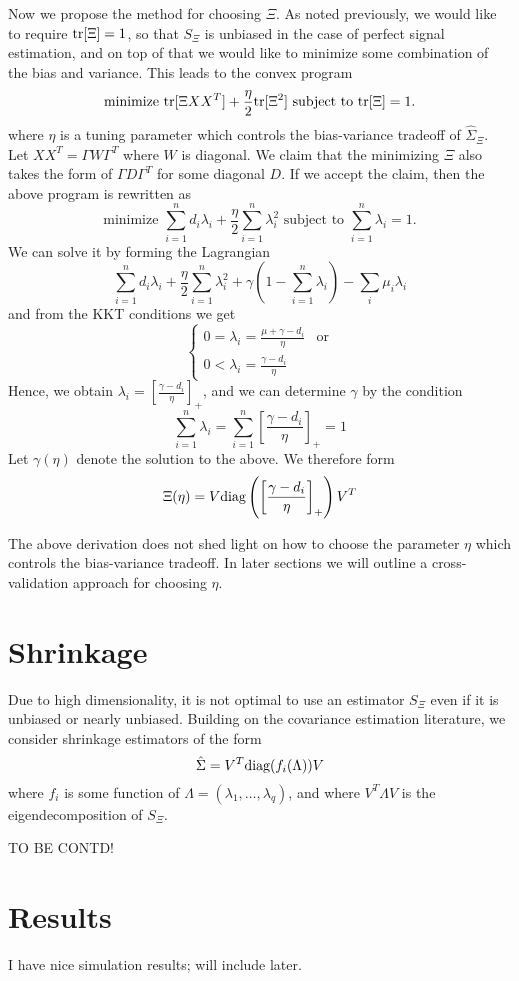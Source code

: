 \documentclass[12pt]{article}
\begin{document}
Now we propose the method for choosing $\Xi$.  As noted previously, we would like to
require $\text{tr}[\Xi] = 1$, so that $S_\Xi$ is unbiased in the case
of perfect signal estimation, and on top of that we would like to minimize some
combination of the bias and variance.  This leads to the convex program
\[
\text{minimize } \text{tr}[\Xi XX^T] + \frac{\eta}{2} \text{tr}[\Xi^2]\text{ subject to }\text{tr}[\Xi]=1.
\]
where $\eta$ is a tuning parameter which controls the bias-variance
tradeoff of $\hat{\Sigma}_\Xi$.  Let $XX^T = \Gamma W\Gamma^T$ where
$W$ is diagonal.  We claim that the minimizing $\Xi$ also takes the
form of $\Gamma D \Gamma^T$ for some diagonal $D$.  If we accept the
claim, then the above program is rewritten as
\[
\text{minimize } \sum_{i=1}^n d_i \lambda_i + \frac{\eta}{2} \sum_{i=1}^n \lambda_i^2 \text{ subject to }\sum_{i=1}^n \lambda_i=1.
\]
We can solve it by forming the Lagrangian
\[
\sum_{i=1}^n d_i \lambda_i + \frac{\eta}{2} \sum_{i=1}^n \lambda_i^2 + \gamma \left(1 - \sum_{i=1}^n \lambda_i\right) - \sum_i \mu_i \lambda_i
\]
and from the KKT conditions we get
\[
\begin{cases}
0 = \lambda_i = \frac{\mu+\gamma - d_i }{\eta} & \text{or}\\
0 < \lambda_i = \frac{\gamma - d_i }{\eta}
\end{cases}
\]
Hence, we obtain $\lambda_i = [\frac{\gamma - d_i }{\eta}]_+$,
and we can determine $\gamma$ by the condition
\[
\sum_{i=1}^n\lambda_i = \sum_{i=1}^n \left[\frac{\gamma - d_i }{\eta}\right]_+
= 1
\]
Let $\gamma(\eta)$ denote the solution to the above.
We therefore form
\[
\Xi(\eta) = V \text{diag}\left(\left[\frac{\gamma - d_i }{\eta}\right]_+\right)V^T
\]

The above derivation does not shed light on how to choose the
parameter $\eta$ which controls the bias-variance tradeoff.  In later
sections we will outline a cross-validation approach for choosing
$\eta$.

\section{Shrinkage}

Due to high dimensionality, it is not optimal to use an estimator
$S_\Xi$ even if it is unbiased or nearly unbiased.
Building on the covariance estimation literature, we consider
shrinkage estimators of the form
\[
\hat{\Sigma} = V^T \text{diag}(f_i(\Lambda)) V
\]
where $f_i$ is some function of $\Lambda = (\lambda_1,\hdots, \lambda_q)$, and
where $V^T \Lambda V$ is the eigendecomposition of $S_\Xi$.

TO BE CONTD!


\section{Results}

I have nice simulation results; will include later.
\end{document}
